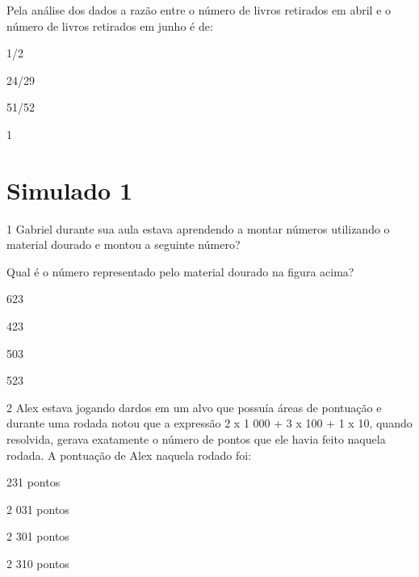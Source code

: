 
Pela análise dos dados a razão entre o número de livros retirados em
abril e o número de livros retirados em junho é de:

\begin{escolha}
\item
  1/2
\item
  24/29
\item
  51/52
\item
  1
\end{escolha}


\chapter{Simulado 1}

\num{1} Gabriel durante sua aula estava aprendendo a montar números
utilizando o material dourado e montou a seguinte número?


Qual é o número representado pelo material dourado na figura acima?

\begin{escolha}
\item
  623
\item
  423
\item
  503
\item
  523
\end{escolha}


\num{2} Alex estava jogando dardos em um alvo que possuía áreas de
pontuação e durante uma rodada notou que a expressão 2 x 1 000 + 3 x 100
+ 1 x 10, quando resolvida, gerava exatamente o número de pontos que ele
havia feito naquela rodada. A pontuação de Alex naquela rodado foi:

\begin{escolha}
\item
  231 pontos
\item
  2 031 pontos
\item
  2 301 pontos
\item
  2 310 pontos
\end{escolha}

